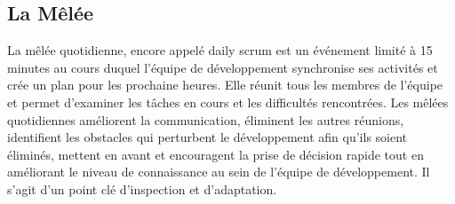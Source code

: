 \subsection{La Mêlée}

La mêlée quotidienne, encore appelé daily scrum est un événement limité à 15 minutes au cours duquel l'équipe de développement synchronise ses activités et crée un plan pour les prochaine heures.
Elle réunit tous les membres de l’équipe et permet d’examiner les tâches en cours et les difficultés rencontrées.
Les mêlées quotidiennes améliorent la communication, éliminent les autres réunions, identifient
les obstacles qui perturbent le développement afin qu'ils soient éliminés, mettent en avant et encouragent la prise de décision rapide tout en améliorant le niveau de connaissance au sein de l’équipe de
développement. Il s’agit d’un point clé d’inspection et d’adaptation.

%

